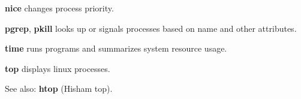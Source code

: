 \begin{enumx}
	\item [\cmd] \textbf{nice} changes process priority.
\end{enumx}

\begin{enumx}
	\item [\cmd] \textbf{pgrep}, \textbf{pkill} looks up or signals 
processes based on name and other attributes.
\end{enumx}

\begin{enumx}
	\item [\cmd] \textbf{time} runs programs and summarizes system resource usage. 
\end{enumx}

\begin{enumx}
	\item [\cmd] \textbf{top} displays linux processes.
	\item [\cmd] See also: \textbf{htop} (Hisham top).
\end{enumx}
